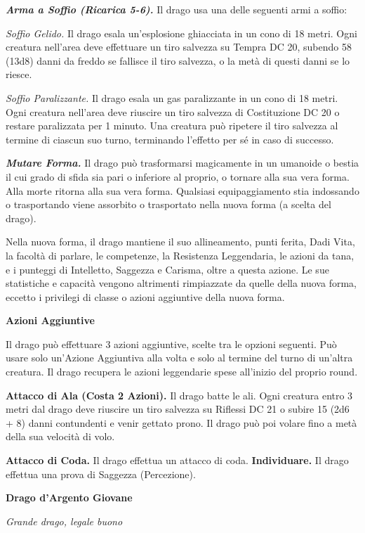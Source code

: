 \begin{multicols}{2}
\emph{\textbf{Arma a Soffio (Ricarica 5-6).}} Il drago usa una delle
seguenti armi a soffio:

\emph{Soffio Gelido.} Il drago esala un'esplosione ghiacciata in un cono
di 18 metri. Ogni creatura nell'area deve effettuare un tiro salvezza su Tempra DC 20, subendo 58 (13d8) danni da freddo se fallisce il
tiro salvezza, o la metà di questi danni se lo riesce.

\emph{Soffio Paralizzante.} Il drago esala un gas paralizzante in un
cono di 18 metri. Ogni creatura nell'area deve riuscire un tiro salvezza
di Costituzione DC 20 o restare paralizzata per 1 minuto. Una creatura
può ripetere il tiro salvezza al termine di ciascun suo turno,
terminando l'effetto per sé in caso di successo.

\emph{\textbf{Mutare Forma.}} Il drago può trasformarsi magicamente in
un umanoide o bestia il cui grado di sfida sia pari o inferiore al
proprio, o tornare alla sua vera forma. Alla morte ritorna alla sua vera
forma. Qualsiasi equipaggiamento stia indossando o trasportando viene
assorbito o trasportato nella nuova forma (a scelta del drago).

Nella nuova forma, il drago mantiene il suo allineamento, punti ferita,
Dadi Vita, la facoltà di parlare, le competenze, la Resistenza
Leggendaria, le azioni da tana, e i punteggi di Intelletto, Saggezza e
Carisma, oltre a questa azione. Le sue statistiche e capacità vengono
altrimenti rimpiazzate da quelle della nuova forma, eccetto i privilegi
di classe o azioni aggiuntive della nuova forma.

\textbf{Azioni Aggiuntive}

Il drago può effettuare 3 azioni aggiuntive, scelte tra le opzioni
seguenti. Può usare solo un'Azione Aggiuntiva alla volta e solo al
termine del turno di un'altra creatura. Il drago recupera le azioni
leggendarie spese all'inizio del proprio round.

\textbf{Attacco di Ala (Costa 2 Azioni).} Il drago batte le ali. Ogni
creatura entro 3 metri dal drago deve riuscire un tiro salvezza su Riflessi DC 21 o subire 15 (2d6 + 8) danni contundenti e venir gettato
prono. Il drago può poi volare fino a metà della sua velocità di volo.

\textbf{Attacco di Coda.} Il drago effettua un attacco di coda.
\textbf{Individuare.} Il drago effettua una prova di Saggezza
(Percezione).

\textbf{Drago d'Argento Giovane}

\emph{Grande drago, legale buono}


\end{multicols}
